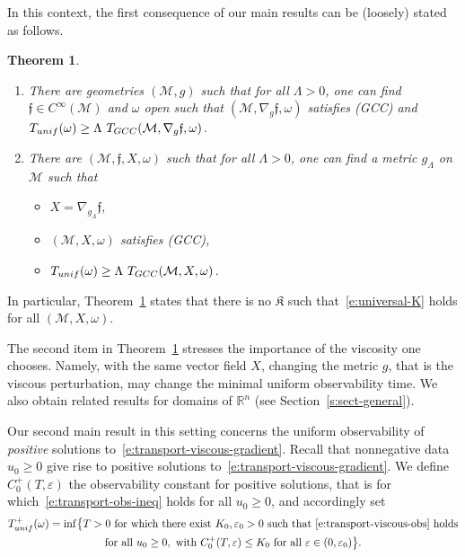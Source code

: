 \documentclass[11pt]{article}
\newcommand{\skpt}{\smallskip}
\numberwithin{equation}{section}
\newcommand{\GCC}{\textup{GCC}}
\newcommand{\pGCC}{\textup{(GCC)}\xspace}
\newcommand{\unif}{\textup{unif}}
\newtheorem{theorem}[lemma]{Theorem}
\theoremstyle{definition}
\newcommand{\M}{\ensuremath{\mathcal M}}
\newcommand{\mb}[1]{\ensuremath{\mathbb{#1}}}
\newcommand{\R}{{\mb{R}}}
\newcommand{\f}{\ensuremath{\mathfrak{f}}}
\newcommand\nablag{\nabla_{g}}
\let\eps\varepsilon
\begin{document}
In this context, the first consequence of our main results can be (loosely) stated as follows.

\skpt
\begin{theorem}
\label{t:loose}
\begin{enumerate}
\item There are geometries $(\M,g)$ such that for all $\Lambda>0$, one can find $\f \in C^\infty(\M)$ and $\omega$ open such that $(\M, \nablag \f, \omega)$ satisfies \pGCC and $T_{\unif}(\omega) \geq \Lambda \ T_{\GCC}(\M, \nablag \f, \omega)$.
\item There are $(\M,\f, X,\omega)$ such that for all $\Lambda>0$, one can find a metric $g_\Lambda$ on $\M$ such that
\begin{itemize}
\item $X = \nabla_{g_\Lambda}\f$,
\item $(\M, X, \omega)$ satisfies \pGCC,
\item $T_{\unif}(\omega) \geq \Lambda \ T_{\GCC}(\M, X, \omega)$.
\end{itemize}
\end{enumerate}
\end{theorem}
In particular, Theorem~\ref{t:loose} states that there is no $\mathfrak{K}$ such that~\eqref{e:universal-K} holds for all $(\M,X,\omega)$.

The second item in Theorem~\ref{t:loose} stresses the importance of the viscosity one chooses. Namely, with the same vector field $X$, changing the metric $g$, that is the viscous perturbation, may change the minimal uniform observability time.
We also obtain related results for domains of $\R^{n}$ (see Section~\ref{s:sect-general}).

Our second main result in this setting concerns the uniform observability of {\em positive} solutions to~\eqref{e:transport-viscous-gradient}. Recall that nonnegative data $u_0\geq 0$ give rise to positive solutions to~\eqref{e:transport-viscous-gradient}. We define $C_0^+(T,\eps)$ the observability constant for positive solutions, that is for which~\eqref{e:transport-obs-ineq} holds for all $u_0\geq0$, and accordingly set
\begin{multline}
\label{defTunif+}
T_{\unif}^+(\omega) = \inf \bigl\{ T >0 \text{ for which there exist }K_0, \eps_0>0 \text{ such that~\eqref{e:transport-viscous-obs} holds}\\
\text{for all }u_0\geq 0, \text{ with }C_0^+(T,\eps)\leq K_0 \text{ for all } \eps \in (0,\eps_0) \bigr\}.
\end{multline}
\end{document}
